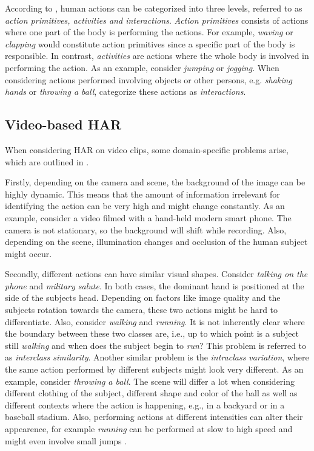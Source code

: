 According to \cite{zhang_review_2017}, human actions can be categorized into three levels, referred to as \textit{action primitives, activities and interactions}.
\textit{Action primitives} consists of actions where one part of the body is performing the actions.
For example, \textit{waving} or \textit{clapping} would constitute action primitives since a specific part of the body is responsible.
In contrast, \textit{activities} are actions where the whole body is involved in performing the action.
As an example, consider \textit{jumping} or \textit{jogging}.
When considering actions performed involving objects or other persons, e.g. \textit{shaking hands} or \textit{throwing a ball}, \cite{zhang_review_2017} categorize these actions as \textit{interactions}.

\subsection{Video-based HAR}
\label{sec:video-based-har}
When considering HAR on video clips, some domain-specific problems arise, which are outlined in \cite{zhang_review_2017}.

Firstly, depending on the camera and scene, the background of the image can be highly dynamic.
This means that the amount of information irrelevant for identifying the action can be very high and might change constantly.
As an example, consider a video filmed with a hand-held modern smart phone.
The camera is not stationary, so the background will shift while recording.
Also, depending on the scene, illumination changes and occlusion of the human subject might occur.

Secondly, different actions can have similar visual shapes.
Consider \textit{talking on the phone} and \textit{military salute}.
In both cases, the dominant hand is positioned at the side of the subjects head.
Depending on factors like image quality and the subjects rotation towards the camera, these two actions might be hard to differentiate.
Also, consider \textit{walking} and \textit{running}.
It is not inherently clear where the boundary between these two classes are, i.e., up to which point is a subject still \textit{walking} and when does the subject begin to \textit{run}?
This problem is referred to as \textit{interclass similarity}.
Another similar problem is the \textit{intraclass variation}, where the same action performed by different subjects might look very different.
As an example, consider \textit{throwing a ball}.
The scene will differ a lot when considering different clothing of the subject, different shape and color of the ball as well as different contexts where the action is happening, e.g., in a backyard or in a baseball stadium.
Also, performing actions at different intensities can alter their appearence, for example \textit{running} can be performed at slow to high speed and might even involve small jumps \cite{kong_human_2018}.

